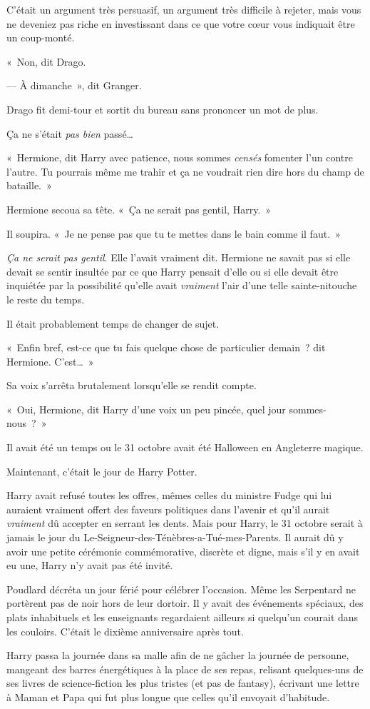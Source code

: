 C'était un argument très persuasif, un argument très difficile à rejeter, mais vous ne deveniez pas riche en investissant dans ce que votre cœur vous indiquait être un coup-monté.

«~Non, dit Drago.

--- À dimanche~», dit Granger.

Drago fit demi-tour et sortit du bureau sans prononcer un mot de plus.

Ça ne s'était \emph{pas bien} passé…

\later

«~Hermione, dit Harry avec patience, nous sommes \emph{censés} fomenter l'un contre l'autre. Tu pourrais même me trahir et ça ne voudrait rien dire hors du champ de bataille.~»

Hermione secoua sa tête. «~Ça ne serait pas gentil, Harry.~»

Il soupira. «~Je ne pense pas que tu te mettes dans le bain comme il faut.~»

\emph{Ça ne serait pas gentil}. Elle l'avait vraiment dit. Hermione ne savait pas si elle devait se sentir insultée par ce que Harry pensait d'elle ou si elle devait être inquiétée par la possibilité qu'elle avait \emph{vraiment} l'air d'une telle sainte-nitouche le reste du temps.

Il était probablement temps de changer de sujet.

«~Enfin bref, est-ce que tu fais quelque chose de particulier demain~? dit Hermione. C'est…~»

Sa voix s'arrêta brutalement lorsqu'elle se rendit compte.

«~Oui, Hermione, dit Harry d'une voix un peu pincée, quel jour sommes-nous~?~»


Il avait été un temps ou le 31 octobre avait été Halloween en Angleterre magique.

Maintenant, c'était le jour de Harry Potter.

Harry avait refusé toutes les offres, mêmes celles du ministre Fudge qui lui auraient vraiment offert des faveurs politiques dans l'avenir et qu'il aurait \emph{vraiment} dû accepter en serrant les dents. Mais pour Harry, le 31 octobre serait à jamais le jour du Le-Seigneur-des-Ténèbres-a-Tué-mes-Parents. Il aurait dû y avoir une petite cérémonie commémorative, discrète et digne, mais s'il y en avait eu une, Harry n'y avait pas été invité.

Poudlard décréta un jour férié pour célébrer l'occasion. Même les Serpentard ne portèrent pas de noir hors de leur dortoir. Il y avait des événements spéciaux, des plats inhabituels et les enseignants regardaient ailleurs si quelqu'un courait dans les couloirs. C'était le dixième anniversaire après tout.

Harry passa la journée dans sa malle afin de ne gâcher la journée de personne, mangeant des barres énergétiques à la place de ses repas, relisant quelques-uns de ses livres de science-fiction les plus tristes (et pas de fantasy), écrivant une lettre à Maman et Papa qui fut plus longue que celles qu'il envoyait d'habitude.

